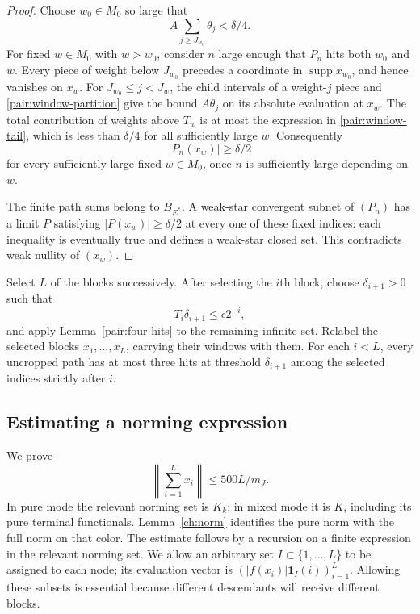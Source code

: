 \begin{proof}
Choose $w_0\in M_0$ so large that
\[
 A\sum_{j\ge J_{w_0}}\theta_j<\delta/4.
\]
For fixed $w\in M_0$ with $w>w_0$, consider $n$ large enough that $P_n$
hits both $w_0$ and $w$.  Every piece of weight below $J_{w_0}$ precedes
a coordinate in $\operatorname{supp}x_{w_0}$, and hence vanishes on $x_w$.
For $J_{w_0}\le j<J_w$, the child intervals of a weight-$j$ piece and
\eqref{pair:window-partition} give the bound $A\theta_j$ on its absolute
evaluation at $x_w$.  The total contribution of weights above $T_w$ is at
most the expression in \eqref{pair:window-tail}, which is less than
$\delta/4$ for all sufficiently large $w$.  Consequently
\[
 |P_n(x_w)|\ge\delta/2
\]
for every sufficiently large fixed $w\in M_0$, once $n$ is sufficiently
large depending on $w$.

The finite path sums belong to $B_{E^*}$.  A weak-star convergent subnet of
$(P_n)$ has a limit $P$ satisfying $|P(x_w)|\ge\delta/2$ at every one of
these fixed indices: each inequality is eventually true and defines a
weak-star closed set.  This contradicts weak nullity of $(x_w)$.
\end{proof}

Select $L$ of the blocks successively.  After selecting the $i$th block,
choose $\delta_{i+1}>0$ such that
\begin{equation}\label{pair:threshold}
 T_i\delta_{i+1}\le\epsilon 2^{-i},
\end{equation}
and apply Lemma~\ref{pair:four-hits} to the remaining infinite set.
Relabel the selected blocks $x_1,\ldots,x_L$, carrying their windows with
them.  For each $i<L$, every uncropped path has at most three hits at
threshold $\delta_{i+1}$ among the selected indices strictly after $i$.

\subsection{Estimating a norming expression}

We prove
\begin{equation}\label{pair:sum-bound}
 \left\|\sum_{i=1}^Lx_i\right\|\le500L/m_J.
\end{equation}
In pure mode the relevant norming set is $K_k$; in mixed mode it is $K$,
including its pure terminal functionals.  Lemma~\ref{ch:norm} identifies
the pure norm with the full norm on that color.  The estimate follows by a
recursion on a finite expression in the relevant norming set.  We allow an arbitrary set $I\subset\{1,\ldots,L\}$ to be assigned to each
node; its evaluation vector is $(|f(x_i)|\mathbf1_I(i))_{i=1}^L$.
Allowing these subsets is essential because different descendants will
receive different blocks.

